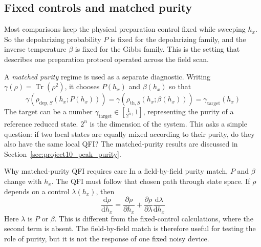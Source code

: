 \subsection{Fixed controls and matched purity}

Most comparisons keep the physical preparation control fixed while sweeping
$h_x$. So the depolarizing probability $P$ is fixed for the depolarizing family,
and the inverse temperature $\beta$ is fixed for the Gibbs family.  This is
the setting that describes one preparation protocol operated across the field
scan.

A \emph{matched purity} regime is used as a separate diagnostic.  Writing
$\gamma(\rho)=\operatorname{Tr}(\rho^2)$, it chooses $P(h_x)$ and
$\beta(h_x)$ so that
\begin{equation}
    \gamma\!\left(\rho_{\mathrm{dep},S}(h_x;P(h_x))\right)
    =
    \gamma\!\left(\rho_{\mathrm{th},S}(h_x;\beta(h_x))\right)
    =
    \gamma_{\mathrm{target}}(h_x)
    \label{eq:purity_matching_cond}
\end{equation}
The target can be a number $\gamma_{\mathrm{target}} \in [\frac{1}{2^n},1]$, representing the purity of a reference reduced state. $2^n$ is the dimension of the system.  This asks a simple
question: if two local states are equally mixed according to their purity, do
they also have the same local QFI?  The matched-purity results are discussed
in Section~\ref{sec:project10_peak_purity}.

\begin{infobox}{Why matched-purity QFI requires care}
    In a field-by-field purity match, $P$ and $\beta$ change with $h_x$.
    The QFI must follow that chosen path through state space.  If
    $\rho$ depends on a control $\lambda(h_x)$, then
    \begin{equation}
        \frac{\mathrm{d}\rho}{\mathrm{d}h_x}
        =
        \frac{\partial\rho}{\partial h_x}
        +
        \frac{\partial\rho}{\partial\lambda}
        \frac{\mathrm{d}\lambda}{\mathrm{d}h_x}
        \label{eq:matched_path_total_derivative}
    \end{equation}
    Here $\lambda$ is $P$ or $\beta$.  This is different from the
    fixed-control calculations, where the second term is absent.  The
    field-by-field match is therefore useful for testing the role of purity,
    but it is not the response of one fixed noisy device.
\end{infobox}


